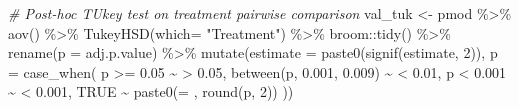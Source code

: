 \documentclass[
]{article}
\newenvironment{Shaded}{\begin{snugshade}}{\end{snugshade}}
\newcommand{\AttributeTok}[1]{\textcolor[rgb]{0.77,0.63,0.00}{#1}}
\newcommand{\CommentTok}[1]{\textcolor[rgb]{0.56,0.35,0.01}{\textit{#1}}}
\newcommand{\ConstantTok}[1]{\textcolor[rgb]{0.00,0.00,0.00}{#1}}
\newcommand{\DecValTok}[1]{\textcolor[rgb]{0.00,0.00,0.81}{#1}}
\newcommand{\FloatTok}[1]{\textcolor[rgb]{0.00,0.00,0.81}{#1}}
\newcommand{\FunctionTok}[1]{\textcolor[rgb]{0.00,0.00,0.00}{#1}}
\newcommand{\NormalTok}[1]{#1}
\newcommand{\OtherTok}[1]{\textcolor[rgb]{0.56,0.35,0.01}{#1}}
\newcommand{\SpecialCharTok}[1]{\textcolor[rgb]{0.00,0.00,0.00}{#1}}
\newcommand{\StringTok}[1]{\textcolor[rgb]{0.31,0.60,0.02}{#1}}
\begin{document}
\begin{Shaded}
\begin{Highlighting}[]
\CommentTok{\# Post{-}hoc TUkey test on treatment pairwise comparison}
\NormalTok{  val\_tuk }\OtherTok{\textless{}{-}}
\NormalTok{    pmod }\SpecialCharTok{\%\textgreater{}\%}
      \FunctionTok{aov}\NormalTok{() }\SpecialCharTok{\%\textgreater{}\%}
          \FunctionTok{TukeyHSD}\NormalTok{(}\AttributeTok{which=} \StringTok{"Treatment"}\NormalTok{) }\SpecialCharTok{\%\textgreater{}\%}
\NormalTok{          broom}\SpecialCharTok{::}\FunctionTok{tidy}\NormalTok{() }\SpecialCharTok{\%\textgreater{}\%}
          \FunctionTok{rename}\NormalTok{(}\AttributeTok{p =}\NormalTok{ adj.p.value) }\SpecialCharTok{\%\textgreater{}\%}
            \FunctionTok{mutate}\NormalTok{(}\AttributeTok{estimate =} \FunctionTok{paste0}\NormalTok{(}\FunctionTok{signif}\NormalTok{(estimate, }\DecValTok{2}\NormalTok{)), }
             \AttributeTok{p =} \FunctionTok{case\_when}\NormalTok{(}
\NormalTok{                  p }\SpecialCharTok{\textgreater{}=} \FloatTok{0.05} \SpecialCharTok{\textasciitilde{}} \StringTok{\textquotesingle{}\textgreater{} 0.05\textquotesingle{}}\NormalTok{,}
                  \FunctionTok{between}\NormalTok{(p, }\FloatTok{0.001}\NormalTok{, }\FloatTok{0.009}\NormalTok{) }\SpecialCharTok{\textasciitilde{}} \StringTok{\textquotesingle{}\textless{} 0.01\textquotesingle{}}\NormalTok{, }
\NormalTok{                  p }\SpecialCharTok{\textless{}} \FloatTok{0.001} \SpecialCharTok{\textasciitilde{}} \StringTok{\textquotesingle{}\textless{} 0.001\textquotesingle{}}\NormalTok{,}
                  \ConstantTok{TRUE} \SpecialCharTok{\textasciitilde{}} \FunctionTok{paste0}\NormalTok{(}\StringTok{\textquotesingle{}= \textquotesingle{}}\NormalTok{, }\FunctionTok{round}\NormalTok{(p, }\DecValTok{2}\NormalTok{))   ))}
\end{Highlighting}
\end{Shaded}
\end{document}
